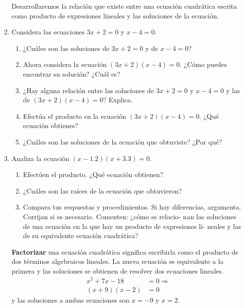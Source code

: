 \documentclass[11pt]{book}
\begin{document}
\begin{enumerate}
          Desarrollaremos la relación que existe entre una ecuación cuadrática escrita como
          producto de expresiones lineales y las soluciones de la ecuación.

    \item Considera las ecuaciones $3x + 2 = 0$ y $x - 4 = 0$.
          \begin{enumerate}
              \item ¿Cuáles son las soluciones de $3x + 2 = 0$ y de $x - 4 = 0$?
              \item Ahora considera la ecuación $(3x + 2)(x - 4) = 0$. ¿Cómo puedes encontrar su solución? ¿Cuál es?
              \item ¿Hay alguna relación entre las soluciones de $3x + 2 = 0$ y $x - 4 = 0$ y las de $(3x + 2)(x - 4) = 0$? Explica.
              \item Efectúa el producto en la ecuación $(3x + 2)(x - 4) = 0$. ¿Qué ecuación obtienes?
              \item ¿Cuáles son las soluciones de la ecuación que obtuviste? ¿Por qué?
          \end{enumerate}

          \newpage

    \item Analiza la ecuación $(x - 1.2) (x + 3.3) = 0$.
          \begin{enumerate}
              \item Efectúen el producto. ¿Qué ecuación obtienen?
              \item ¿Cuáles son las raíces de la ecuación que obtuvieron?
              \item Compara tus respuestas y procedimientos. Si hay diferencias, argumenta. Corrijan si es necesario. Comenten: ¿cómo se relacio-
                    nan las soluciones de una ecuación en la que hay un producto de expresiones li-
                    neales y las de su equivalente ecuación cuadrática?
          \end{enumerate}

          \begin{boxH}
              \textbf{Factorizar} una ecuación cuadrática significa escribirla como el producto de dos
              términos algebraicos lineales. La nueva ecuación es equivalente a la primera y las
              soluciones se obtienen de resolver dos ecuaciones lineales.
              \begin{align*}
                  x^2 + 7x - 18  & = 0 \Rightarrow \\
                  (x + 9)(x - 2) & = 0
              \end{align*}
              y las soluciones a ambas ecuaciones son $x = - 9$ y $x = 2$.
          \end{boxH}


\end{enumerate}
\end{document}
